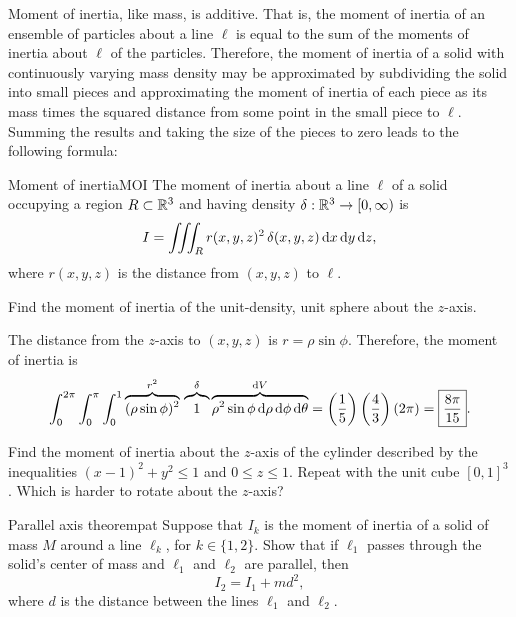 \documentclass[prettycode,shellescape]{watsonbook}
\begin{document}
Moment of inertia, like mass, is additive. That is, the moment of
inertia of an ensemble of particles about a line $\ell$ is equal to
the sum of the moments of inertia about $\ell$ of the
particles. Therefore, the moment of inertia of a solid with
continuously varying mass density may be approximated by subdividing
the solid into small pieces and approximating the moment of inertia of
each piece as its mass times the squared distance from some point in
the small piece to $\ell$. Summing the results and taking the size of
the pieces to zero leads to the following formula:
\begin{defn}{Moment of inertia}{MOI}
  The moment of inertia about a line $\ell$ of a solid occupying a
  region $R\subset \mathbb{R}^3$ and having density $\delta: \mathbb{R}^3 \to [0,\infty)$ is 
  \[
    I = \iiint_{R} r(x,y,z)^2 \, \delta(x,y,z) \, \mathrm{d} x \, \mathrm{d} y\, \mathrm{d} z, 
  \]
  where $r(x,y,z)$ is the distance from $(x,y,z)$ to $\ell$. 
\end{defn}

\begin{example}{}{}
  Find the moment of inertia of the unit-density, unit sphere about
  the $z$-axis.
\end{example}

\begin{solution}
  The distance from the $z$-axis to $(x,y,z)$ is $r = \rho \sin
  \phi$. Therefore, the moment of inertia is
  \[
    \int_{0}^{2\pi}\int_0^\pi \int_0^1 \overbrace{(\rho \sin
      \phi)^2}^{r^2} \, \overbrace{\vphantom{\rho^2}
      1}^{\delta}\overbrace{\rho^2 \sin \phi \, \mathrm{d}\rho \, \mathrm{d}\phi \,
      \mathrm{d}\theta}^{\mathrm{d} V} = \left(\frac{1}{5}\right)
    \left(\frac{4}{3}\right) \left(2\pi\right) =
    \boxed{\frac{8\pi}{15}}.
  \]
\end{solution}

\begin{exercise}{}{}
  Find the moment of inertia about the $z$-axis of the cylinder
  described by the inequalities $(x-1)^2 + y^2 \leq 1$ and
  $0 \leq z \leq 1$. Repeat with the unit cube $[0,1]^3$. Which is
  harder to rotate about the $z$-axis?
\end{exercise}

\begin{exercise}{Parallel axis theorem}{pat}
  Suppose that $I_k$ is the moment of inertia of a solid of mass $M$
  around a line $\ell_k$, for $k\in \{1,2\}$. Show that if $\ell_1$
  passes through the solid's center of mass and $\ell_1$ and $\ell_2$
  are parallel, then
  \[
    I_2 = I_1 + md^2,
  \]
  where $d$ is the distance between the lines $\ell_1$ and $\ell_2$. 
\end{exercise}
\end{document}
